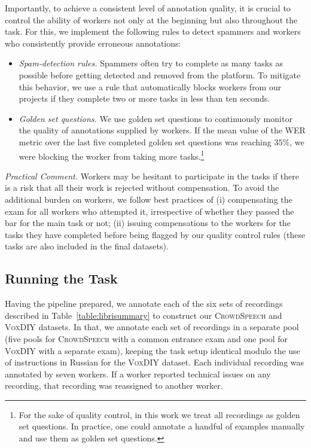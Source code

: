 \documentclass{article}
\newcommand{\speech}{\textsc{CrowdSpeech}}
\newcommand{\vox}{\textsc{VoxDIY}}
\begin{document}
Importantly, to achieve a consistent level of annotation quality, it is crucial to control the ability of workers not only at the beginning but also throughout the task. For this, we implement the following rules to detect spammers and workers who consistently provide erroneous annotations:

\begin{itemize}[itemsep=2pt, leftmargin=15pt, topsep=0pt]
  \item \emph{Spam-detection rules.} Spammers often try to complete as many tasks as possible before getting detected and removed from the platform. To mitigate this behavior, we use a rule that automatically blocks workers from our projects if they complete two or more tasks in less than ten seconds.
  
  \item \emph{Golden set questions.} We use golden set questions to continuously monitor the quality of annotations supplied by workers. If the mean value of the WER metric over the last five completed golden set questions was reaching $35\%$, we were blocking the worker from taking more tasks.\footnote{For the sake of quality control, in this work we treat all recordings as golden set questions. In practice, one could annotate a handful of examples manually and use them as golden set questions.}
\end{itemize}

\emph{Practical Comment.} Workers may be hesitant to participate in the tasks if there is a risk that all their work is rejected without compensation. To avoid the additional burden on workers, we follow best practices of (i) compensating the exam for all workers who attempted it, irrespective of whether they passed the bar for the main task or not; (ii) issuing compensations to the workers for the tasks they have completed before being flagged by our quality control rules (these tasks are also included in the final datasets).

\subsection{Running the Task}

Having the pipeline prepared, we annotate each of the six sets of recordings described in Table~\ref{table:librisummary} to construct our \speech{} and \vox{} datasets. In that, we annotate each set of recordings in a separate pool (five pools for \speech{} with a common entrance exam and one pool for \vox{} with a separate exam), keeping the task setup identical modulo the use of instructions in Russian for the \vox{} dataset.  Each individual recording was annotated by seven workers. If a worker reported technical issues on any recording, that recording was reassigned to another worker. 
\end{document}
